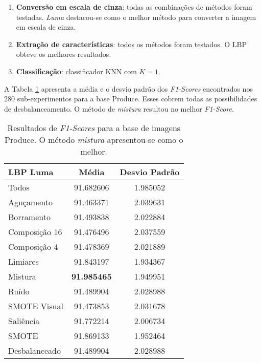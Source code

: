 \begin{enumerate}
\item \textbf{Conversão em escala de cinza}: todas as combinações de métodos foram testadas. \emph{Luma} destacou-se como o melhor método para converter a imagem em escala de cinza.
\item \textbf{Extração de características}: todos os métodos foram testados. O LBP obteve os melhores resultados.
\item \textbf{Classificação}: classificador KNN com $K=1$.
\end{enumerate}


A Tabela \ref{tab:resultados:3.3} apresenta a média e o desvio padrão dos \textit{F1-Scores} encontrados nos 280 sub-experimentos para a base Produce. Esses cobrem todas as possibilidades de desbalanceamento. O método de \emph{mistura} resultou no melhor \textit{F1-Score}.

\begin{table}[H]
\begin{center}
\caption{Resultados de \textit{F1-Scores} para a base de imagens Produce. O método \emph{mistura} apresentou-se como o melhor.}
\label{tab:resultados:3.3}
\begin{tabular}{|l|c|c|}
\hline
\textbf{LBP Luma} & \textbf{Média}     & \textbf{Desvio Padrão} \\ \hline
   Todos        &  91.682606 &  1.985052  \\ \hline
  Aguçamento    &  91.463371 &  2.039631  \\ \hline
  Borramento    &  91.493838 &  2.022884  \\ \hline
  Composição 16 &  91.476496 &  2.037559  \\ \hline
  Composição 4  &  91.478369 &  2.021889  \\ \hline
  Limiares      &  91.843197 &  1.934367  \\ \hline
  Mistura       &  \textbf{91.985465} &  1.949951  \\ \hline
  Ruído         &  91.489904 &  2.028988  \\ \hline
  SMOTE Visual  &  91.473853 &  2.031678  \\ \hline
  Saliência     &  91.772214 &  2.006734  \\ \hline
 SMOTE          &  91.869133 &  1.952464  \\ \hline
Desbalanceado   &  91.489904 &  2.028988  \\ \hline
\end{tabular}
\end{center}
\end{table}

